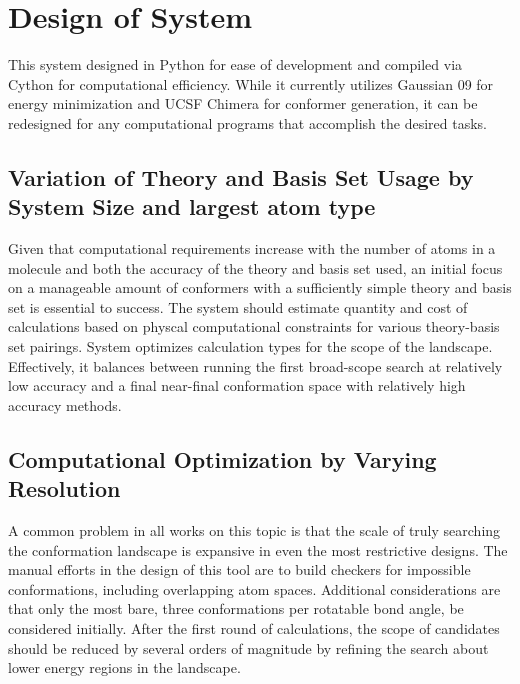 \section{Design of System}

This system designed in Python for ease of development and compiled via Cython for computational efficiency. 
While it currently utilizes Gaussian 09 for energy minimization and UCSF Chimera for conformer generation, it can be redesigned for any computational programs that accomplish the desired tasks.

\subsection{Variation of Theory and Basis Set Usage by System Size and largest atom type}

Given that computational requirements increase with the number of atoms in a molecule and both the accuracy of the theory and basis set used, an initial focus on a manageable amount of conformers with a sufficiently simple theory and basis set is essential to success.
The system should estimate quantity and cost of calculations based on physcal computational constraints for various theory-basis set pairings. 
System optimizes calculation types for the scope of the landscape.
Effectively, it balances between running the first broad-scope search at relatively low accuracy and a final near-final conformation space with relatively high accuracy methods.


\subsection{Computational Optimization by Varying Resolution}

A common problem in all works on this topic is that the scale of truly searching the conformation landscape is expansive in even the most restrictive designs. 
The manual efforts in the design of this tool are to build checkers for impossible conformations, including overlapping atom spaces.
Additional considerations are that only the most bare, three conformations per rotatable bond angle, be considered initially.
After the first round of calculations, the scope of candidates should be reduced by several orders of magnitude by refining the search about lower energy regions in the landscape.


